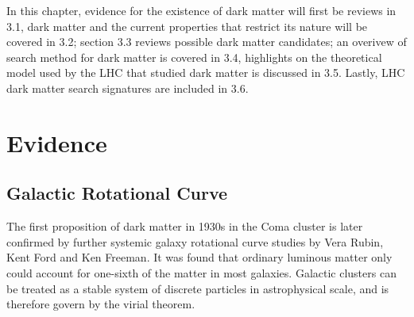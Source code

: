     In this chapter, evidence for the existence of dark matter will first be reviews in 3.1, dark matter and the current properties that restrict its nature will be covered in 3.2; section 3.3 reviews possible dark matter candidates; an overivew of search method for dark matter is covered in 3.4,  highlights on the theoretical model used by the LHC that studied dark matter is discussed in 3.5. Lastly, LHC dark matter search signatures are included in 3.6.

\section{Evidence}

\subsection{Galactic Rotational Curve}
    The first proposition of dark matter in 1930s in the Coma cluster is later confirmed by further systemic galaxy rotational curve studies by Vera Rubin, Kent Ford and Ken Freeman. It was found that ordinary luminous matter only could account for one-sixth of the matter in most galaxies. 
    Galactic clusters can be treated as a stable system of discrete particles in astrophysical scale, and is therefore govern by the virial theorem.
